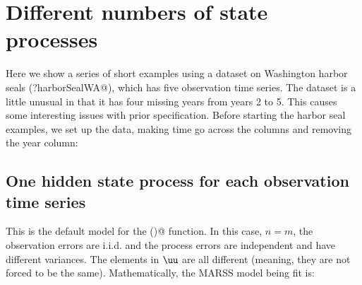\section{Different numbers of state processes}
Here we show a series of short examples using a dataset on Washington harbor seals (\verb@?harborSealWA@), which has five observation time series.   The dataset is a little unusual in that it has four missing years from years 2 to 5.  This causes some interesting issues with prior specification.  Before starting the harbor seal examples, we set up the data, making time go across the columns and removing the year column:


\subsection{One hidden state process for each observation time series}
This is the default model for the \verb@MARSS()@ function.  In this case, $n=m$, the observation errors are i.i.d. and the process errors are independent and have different variances.  The elements in $\uu$ are all different (meaning, they are not forced to be the same).  Mathematically, the MARSS model being fit is:
